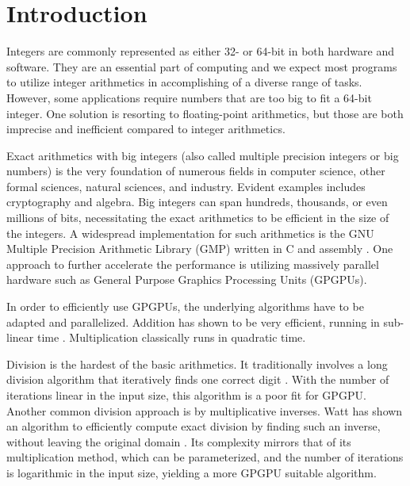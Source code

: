 \section{Introduction}
\label{sec:intro}

Integers are commonly represented as either 32- or 64-bit in both hardware and
software. They are an essential part of computing and we expect most programs to
utilize integer arithmetics in accomplishing of a diverse range of
tasks. However, some applications require numbers that are too big to fit a
64-bit integer. One solution is resorting to floating-point arithmetics, but
those are both imprecise and inefficient compared to integer arithmetics.

Exact arithmetics with big integers (also called multiple precision integers or
big numbers) is the very foundation of numerous fields in computer science,
other formal sciences, natural sciences, and industry. Evident examples includes
cryptography and algebra. Big integers can span hundreds, thousands, or even
millions of bits, necessitating the exact arithmetics to be efficient in the
size of the integers. A widespread implementation for such arithmetics is the
GNU Multiple Precision Arithmetic Library (GMP) written in C and assembly
\cite{GMP}. One approach to further accelerate the performance is utilizing
massively parallel hardware such as General Purpose Graphics Processing Units
(GPGPUs).

In order to efficiently use GPGPUs, the underlying algorithms have to be adapted
and parallelized. Addition has shown to be very efficient, running in sub-linear
time \cite{DPPproject,blellochaddscan}. Multiplication classically runs in
quadratic time. {\red [Missing]}


Division is the hardest of the basic arithmetics. It traditionally involves a
long division algorithm that iteratively finds one correct digit
\cite{knuth97}. With the number of iterations linear in the input size, this
algorithm is a poor fit for GPGPU. Another common division approach is by
multiplicative inverses. Watt has shown an algorithm to efficiently compute
exact division by finding such an inverse, without leaving the original domain
\cite{watt2023efficient}. Its complexity mirrors that of its multiplication
method, which can be parameterized, and the number of iterations is logarithmic
in the input size, yielding a more GPGPU suitable algorithm.
\newline

